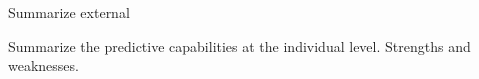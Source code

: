 \documentclass[12pt,letterpaper]{article}
\begin{document}



Summarize external

Summarize the predictive capabilities at the individual level.  Strengths and weaknesses.
\end{document}

